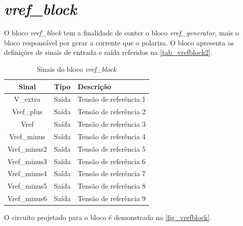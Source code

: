 \renewcommand{\NomeBloco}{\emph{vref\_block}}
\newcommand{\NomeBlocoA}{vrefblock}
\renewcommand{\NomePTab}{tab_\NomeBlocoA}
\renewcommand{\NomeSTab}{tab_\NomeBlocoA2}
\renewcommand{\NomePFig}{fig_\NomeBlocoA}
\renewcommand{\NomeSFig}{fig_\NomeBlocoA2}
\renewcommand{\NomeTTab}{tab_\NomeBlocoA3}

\section{\NomeBloco}

O bloco \NomeBloco{} tem a finalidade de conter o bloco \emph{vref\_generator}, mais o bloco respons\'avel por gerar a corrente que o polariza. O bloco apresenta as defini{\c c}\~oes de sinais de entrada e sa\'ida referidos na \autoref{\NomeSTab}.

\begin{table}[htbp]
\caption{Sinais do bloco \NomeBloco}
\label{\NomeSTab}
\centering
\begin{tabular}{ccl}

    \toprule
    Sinal & Tipo    & Descri{\c c}\~ao      \\
    \midrule \midrule
    V\_extra   & Saída   & Tens\~ao de refer\^encia 1 \\
    \midrule
    Vref\_plus   & Saída   & Tens\~ao de refer\^encia 2 \\
    \midrule
    Vref   & Saída   & Tens\~ao de refer\^encia 3 \\
    \midrule
    Vref\_minus   & Saída   & Tens\~ao de refer\^encia 4 \\
    \midrule
    Vref\_minus2   & Saída   & Tens\~ao de refer\^encia 5 \\
    \midrule
    Vref\_minus3   & Saída   & Tens\~ao de refer\^encia 6 \\
    \midrule
    Vref\_minus4  & Saída   & Tens\~ao de refer\^encia 7 \\
    \midrule
    Vref\_minus5   & Saída   & Tens\~ao de refer\^encia 8 \\
    \midrule
    Vref\_minus6   & Saída   & Tens\~ao de refer\^encia 9 \\
    \bottomrule
\end{tabular}
\end{table}

O circuito projetado para o bloco \'e demonstrado na \autoref{\NomePFig}.


